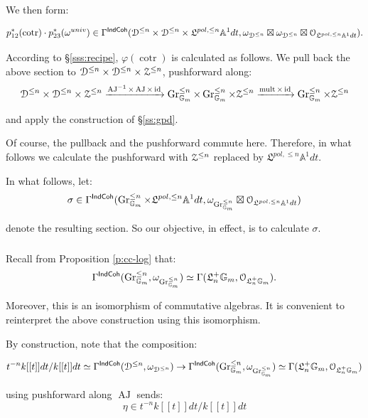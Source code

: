 \documentclass[reqno,11pt]{amsart}
\numberwithin{equation}{subsection}
\theoremstyle{remark}
\newcommand{\xar}[1]{\xrightarrow{#1}}
\newcommand{\bA}{{\mathbb A}}
\newcommand{\bG}{{\mathbb G}}
\newcommand{\sD}{{\EuScript D}}
\newcommand{\sO}{{\EuScript O}}
\newcommand{\sZ}{{\EuScript Z}}
\newcommand{\fL}{{\mathfrak L}}
\newcommand{\on}{\operatorname}
\newcommand{\id}{\on{id}}
\newcommand{\cotr}{\on{cotr}}
\newcommand{\vph}{\varphi}
\newcommand{\Gr}{\on{Gr}}
\newcommand{\IndCoh}{\mathsf{IndCoh}}
\newcommand{\AJ}{\on{AJ}}
\begin{document}
\noindent We then form:

\[
p_{12}^*(\cotr) \cdot p_{23}^*(\omega^{univ}) \in 
\Gamma^{\IndCoh}(\sD^{\leq n} \times \sD^{\leq n} \times 
\fL^{pol,\leq n} \bA^1 dt,
\omega_{\sD^{\leq n}} \boxtimes \omega_{\sD^{\leq n}} \boxtimes 
\sO_{\fL^{pol,\leq n} \bA^1 dt}).
\]

According to \S \ref{sss:recipe}, $\vph(\cotr)$ is calculated as follows.
We pull back the above section to $\sD^{\leq n} \times \sD^{\leq n} \times 
\sZ^{\leq n}$, pushforward along:
%
\[
\sD^{\leq n} \times \sD^{\leq n} \times \sZ^{\leq n}
\xar{\AJ^{-1} \times \AJ \times \id}
\Gr_{\bG_m}^{\leq n} \times \Gr_{\bG_m}^{\leq n} 
\times \sZ^{\leq n} \xar{\on{mult} \times \id} 
\Gr_{\bG_m}^{\leq n} \times \sZ^{\leq n}
\] 

\noindent and apply the construction of \S \ref{ss:gpd}.

Of course, the pullback and the pushforward commute here. 
Therefore, in what follows we calculate the pushforward with $\sZ^{\leq n}$
replaced by $\fL^{pol,\leq n} \bA^1 dt$.

In what follows, let:
%
\[
\sigma \in \Gamma^{\IndCoh}(\Gr_{\bG_m}^{\leq n} \times \fL^{pol,\leq n} \bA^1 dt,
\omega_{\Gr_{\bG_m}^{\leq n}} \boxtimes \sO_{\fL^{pol,\leq n} \bA^1 dt})
\]

\noindent denote the resulting section. So our objective, in effect, is to calculate
$\sigma$.

\subsubsection{}

Recall from Proposition \ref{p:cc-log} that: 
%
\begin{equation}\label{eq:gr-cc}
\Gamma^{\IndCoh}(\Gr_{\bG_m}^{\leq n},\omega_{\Gr_{\bG_m}^{\leq n}}) \simeq 
\Gamma(\fL_n^+ \bG_m,\sO_{\fL_n^+ \bG_m}).
\end{equation}

\noindent Moreover, this is an isomorphism of commutative algebras. It is
convenient to reinterpret the above construction using this isomorphism.

By construction, note that the composition:

\[
t^{-n}k[[t]]dt/k[[t]]dt \simeq 
\Gamma^{\IndCoh}(\sD^{\leq n},\omega_{\sD^{\leq n}}) \to 
\Gamma^{\IndCoh}(\Gr_{\bG_m}^{\leq n},\omega_{\Gr_{\bG_m}^{\leq n}}) 
\simeq \Gamma(\fL_n^+ \bG_m,\sO_{\fL_n^+ \bG_m})
\]

\noindent using pushforward along $\AJ$ sends:
%
\[
\eta \in t^{-n}k[[t]]dt/k[[t]]dt
\] 
\end{document}
